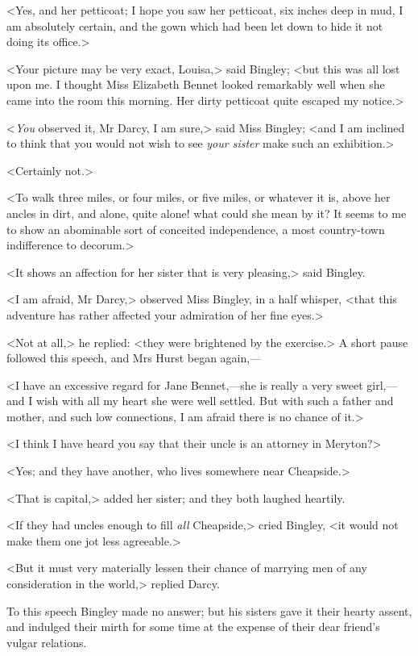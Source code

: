 <Yes, and her petticoat; I hope you saw her petticoat, six inches deep in mud, I am absolutely certain, and the gown which had been let down to hide it not doing its office.>

<Your picture may be very exact, Louisa,> said Bingley; <but this was all lost upon me. I thought Miss Elizabeth Bennet looked remarkably well when she came into the room this morning. Her dirty petticoat quite escaped my notice.>

<\textit{You} observed it, Mr Darcy, I am sure,> said Miss Bingley; <and I am inclined to think that you would not wish to see \textit{your sister} make such an exhibition.>

<Certainly not.>

<To walk three miles, or four miles, or five miles, or whatever it is, above her ancles in dirt, and alone, quite alone! what could she mean by it? It seems to me to show an abominable sort of conceited independence, a most country-town indifference to decorum.>

<It shows an affection for her sister that is very pleasing,> said Bingley.

<I am afraid, Mr Darcy,> observed Miss Bingley, in a half whisper, <that this adventure has rather affected your admiration of her fine eyes.>

<Not at all,> he replied: <they were brightened by the exercise.> A short pause followed this speech, and Mrs Hurst began again,—

<I have an excessive regard for Jane Bennet,—she is really a very sweet girl,—and I wish with all my heart she were well settled. But with such a father and mother, and such low connections, I am afraid there is no chance of it.>

<I think I have heard you say that their uncle is an attorney in Meryton?>

<Yes; and they have another, who lives somewhere near Cheapside.>

<That is capital,> added her sister; and they both laughed heartily.

<If they had uncles enough to fill \textit{all} Cheapside,> cried Bingley, <it would not make them one jot less agreeable.>

<But it must very materially lessen their chance of marrying men of any consideration in the world,> replied Darcy.

To this speech Bingley made no answer; but his sisters gave it their hearty assent, and indulged their mirth for some time at the expense of their dear friend's vulgar relations.

